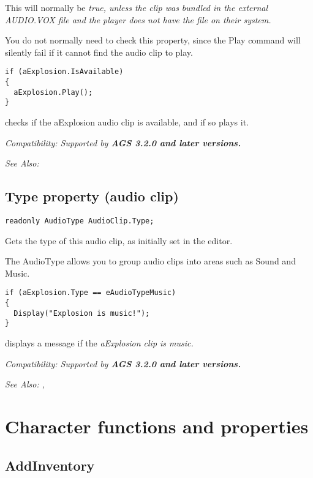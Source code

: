 This will normally be \it{true}, unless the clip was bundled in the external AUDIO.VOX
file and the player does not have the file on their system.

You do not normally need to check this property, since the Play command will silently
fail if it cannot find the audio clip to play.

\begin{verbatim}
if (aExplosion.IsAvailable)
{
  aExplosion.Play();
}
\end{verbatim}
checks if the aExplosion audio clip is available, and if so plays it.

\it{Compatibility:} Supported by \bf{AGS 3.2.0} and later versions.

\it{See Also:} 


\subsection{Type property (audio clip)}\label{AudioClip.Type}%

\begin{verbatim}
readonly AudioType AudioClip.Type;
\end{verbatim}
Gets the type of this audio clip, as initially set in the editor.

The AudioType allows you to group audio clips into areas such as Sound and Music.

\begin{verbatim}
if (aExplosion.Type == eAudioTypeMusic)
{
  Display("Explosion is music!");
}
\end{verbatim}
displays a message if the \it{aExplosion} clip is music.

\it{Compatibility:} Supported by \bf{AGS 3.2.0} and later versions.

\it{See Also:} ,


\section{Character functions and properties}%


\subsection{AddInventory}\label{Character.AddInventory}%

